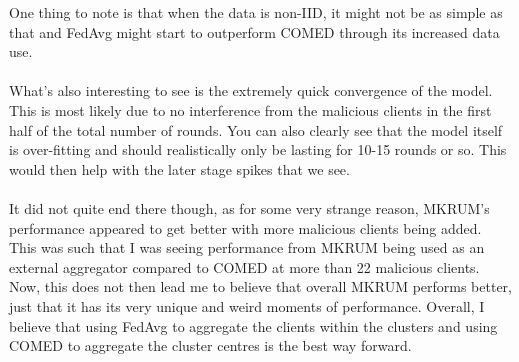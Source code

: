 One thing to note is that when the data is non-IID, it might not be as simple as that and FedAvg might start to outperform COMED through its increased data use.
\\ \\
What's also interesting to see is the extremely quick convergence of the model.
This is most likely due to no interference from the malicious clients in the first half of the total number of rounds.
You can also clearly see that the model itself is over-fitting and should realistically only be lasting for 10-15 rounds or so.
This would then help with the later stage spikes that we see.
\\ \\
It did not quite end there though, as for some very strange reason, MKRUM's performance appeared to get better with more malicious clients being added.
This was such that I was seeing performance from MKRUM being used as an external aggregator compared to COMED at more than 22 malicious clients.
Now, this does not then lead me to believe that overall MKRUM performs better, just that it has its very unique and weird moments of performance.
Overall, I believe that using FedAvg to aggregate the clients within the clusters and using COMED to aggregate the cluster centres is the best way forward.


